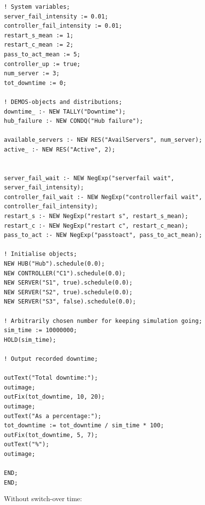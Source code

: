 \documentclass[11pt]{article}
\begin{document}
\begin{lstlisting}
! System variables;
server_fail_intensity := 0.01;
controller_fail_intensity := 0.01;
restart_s_mean := 1;
restart_c_mean := 2;
pass_to_act_mean := 5;
controller_up := true;
num_server := 3;
tot_downtime := 0;

! DEMOS-objects and distributions;        
downtime_ :- NEW TALLY("Downtime");
hub_failure :- NEW CONDQ("Hub failure");

available_servers :- NEW RES("AvailServers", num_server);
active_ :- NEW RES("Active", 2);


server_fail_wait :- NEW NegExp("serverfail wait", server_fail_intensity);
controller_fail_wait :- NEW NegExp("controllerfail wait", controller_fail_intensity);
restart_s :- NEW NegExp("restart s", restart_s_mean);
restart_c :- NEW NegExp("restart c", restart_c_mean);
pass_to_act :- NEW NegExp("passtoact", pass_to_act_mean);

! Initialise objects;
NEW HUB("Hub").schedule(0.0);
NEW CONTROLLER("C1").schedule(0.0);
NEW SERVER("S1", true).schedule(0.0);
NEW SERVER("S2", true).schedule(0.0);
NEW SERVER("S3", false).schedule(0.0);

! Arbitrarily chosen number for keeping simulation going;
sim_time := 10000000;
HOLD(sim_time);

! Output recorded downtime;

outText("Total downtime:");
outimage;
outFix(tot_downtime, 10, 20);
outimage;
outText("As a percentage:");
tot_downtime := tot_downtime / sim_time * 100;
outFix(tot_downtime, 5, 7);
outText("%");
outimage;

END;
END;

\end{lstlisting}

Without switch-over time:
\end{document}
